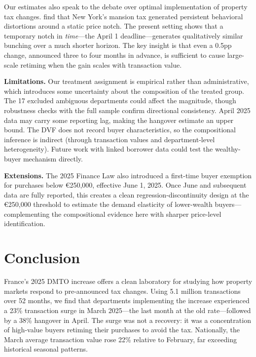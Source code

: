 \documentclass[12pt]{article}
\begin{document}
Our estimates also speak to the debate over optimal implementation of property tax changes.
\citet{kopczuk2015} find that New York's mansion tax generated persistent behavioral
distortions around a static price notch. The present setting shows that a temporary notch in
\textit{time}---the April 1 deadline---generates qualitatively similar bunching over a much shorter
horizon. The key insight is that even a 0.5pp change, announced three to four months in advance,
is sufficient to cause large-scale retiming when the gain scales with transaction value.

\textbf{Limitations.} Our treatment assignment is empirical rather than administrative, which
introduces some uncertainty about the composition of the treated group. The 17 excluded ambiguous
departments could affect the magnitude, though robustness checks with the full sample confirm
directional consistency. April 2025 data may carry some reporting lag, making the hangover
estimate an upper bound. The DVF does not record buyer characteristics, so the compositional
inference is indirect (through transaction values and department-level heterogeneity). Future work
with linked borrower data could test the wealthy-buyer mechanism directly.

\textbf{Extensions.} The 2025 Finance Law also introduced a first-time buyer exemption for
purchases below \euro{}250,000, effective June 1, 2025. Once June and subsequent data are
fully reported, this creates a clean regression-discontinuity design at the \euro{}250,000
threshold to estimate the demand elasticity of lower-wealth buyers---complementing the
compositional evidence here with sharper price-level identification.

\section{Conclusion}

France's 2025 DMTO increase offers a clean laboratory for studying how property markets respond
to pre-announced tax changes. Using 5.1 million transactions over 52 months, we find that
departments implementing the increase experienced a 23\% transaction surge in March 2025---the
last month at the old rate---followed by a 38\% hangover in April. The surge was not a recovery:
it was a concentration of high-value buyers retiming their purchases to avoid the tax. Nationally,
the March average transaction value rose 22\% relative to February, far exceeding historical
seasonal patterns.
\end{document}
